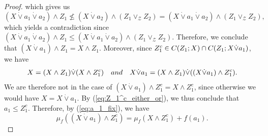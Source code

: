 \documentclass[a4paper,11pt,reqno]{article}
\theoremstyle{definition}
\begin{document}
\begin{proof}
which gives us
\[
(X \dot\vee a_1 \dot\vee a_2) \wedge Z_1 \nleq (X \dot\vee a_2) \wedge (Z_1 \vee_\mathcal{Z} Z_2) = (X \dot\vee a_1 \dot\vee a_2) \wedge (Z_1 \vee_\mathcal{Z} Z_2),
\]
which yields a contradiction since $(X \dot\vee a_1 \dot\vee a_2) \wedge Z_1 \leq (X \dot\vee a_1 \dot\vee a_2) \wedge (Z_1 \vee_\mathcal{Z} Z_2)$. Therefore, we conclude that $(X \dot\vee a_1) \wedge Z_1 = X \wedge Z_1$. Moreover, since $Z_1^c \in \textup{\textbf{C}}(Z_1; X) \cap \textup{\textbf{C}}(Z_1; X \dot\vee a_1)$, we have
$$X=(X\wedge Z_1)\dot\vee(X\wedge Z_1^c)\quad\textup{and}\quad X\dot\vee a_1=(X\wedge Z_1)\dot\vee((X\dot\vee a_1)\wedge Z_1^c).$$
We are therefore not in the case of $(X\dot\vee a_1)\wedge Z_1^c=X\wedge Z_1^c$, since otherwise we would have $X=X\dot\vee a_1$. By (\ref{eq:Z_1^c_either_or}), we thus conclude that $a_1\leq Z_1^c$. Therefore, by (\ref{eq:a_1_fix}), we have
$$\mu_f((X\dot\vee a_1)\wedge Z_1^c)=\mu_f(X\wedge Z_1^c)+f(a_1).$$


\end{proof}
\end{document}
